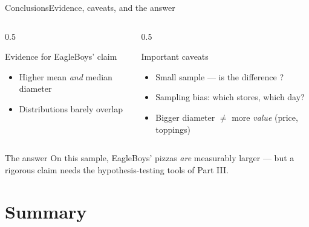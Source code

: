 \documentclass[aspectratio=169,11pt]{beamer}
\begin{document}
\begin{frame}{Conclusions}{Evidence, caveats, and the answer}
  \begin{columns}[T]
    \begin{column}{0.5\textwidth}
      \begin{exampleblock}{Evidence for EagleBoys' claim}
        \small
        \begin{itemize}
          \item Higher mean \emph{and} median diameter
          \item Distributions barely overlap
        \end{itemize}
      \end{exampleblock}
    \end{column}
    \begin{column}{0.5\textwidth}
      \begin{alertblock}{Important caveats}
        \small
        \begin{itemize}
          \item Small sample — is the difference ?
          \item Sampling bias: which stores, which day?
          \item Bigger diameter $\neq$ more \emph{value} (price, toppings)
        \end{itemize}
      \end{alertblock}
    \end{column}
  \end{columns}
  \vfill
  \begin{block}{The answer}
    \small On this sample, EagleBoys' pizzas \emph{are} measurably larger —
    but a rigorous claim needs the hypothesis-testing tools of Part III.
  \end{block}
\end{frame}

\section{Summary}
\end{document}
